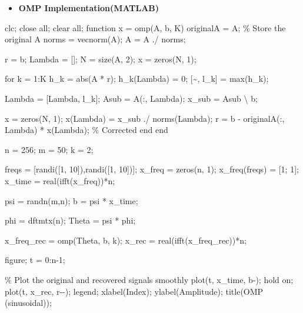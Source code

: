 \documentclass[
  letterpaper,
  DIV=11,
  numbers=noendperiod]{scrartcl}
\newenvironment{Shaded}{\begin{snugshade}}{\end{snugshade}}
\newcommand{\NormalTok}[1]{\textcolor[rgb]{0.97,0.97,0.95}{#1}}
\providecommand{\tightlist}{%
  \setlength{\itemsep}{0pt}\setlength{\parskip}{0pt}}
\begin{document}
\begin{itemize}
\tightlist
\item
  \textbf{OMP Implementation(MATLAB)}
\end{itemize}

\begin{Shaded}
\begin{Highlighting}[]
\NormalTok{clc; close all; clear all;}
\NormalTok{function x = omp(A, b, K)}
\NormalTok{    originalA = A;               \% Store the original A}
\NormalTok{    norms = vecnorm(A);}
\NormalTok{    A = A ./ norms;}

\NormalTok{    r = b;}
\NormalTok{    Lambda = [];}
\NormalTok{    N = size(A, 2);}
\NormalTok{    x = zeros(N, 1);}

\NormalTok{    for k = 1:K}
\NormalTok{        h\_k = abs(A\textquotesingle{} * r);}
\NormalTok{        h\_k(Lambda) = 0;}
\NormalTok{        [\textasciitilde{}, l\_k] = max(h\_k);}

\NormalTok{        Lambda = [Lambda, l\_k];}
\NormalTok{        Asub = A(:, Lambda);}
\NormalTok{        x\_sub = Asub \textbackslash{} b;}

\NormalTok{        x = zeros(N, 1);}
\NormalTok{        x(Lambda) = x\_sub ./ norms(Lambda)\textquotesingle{};}
\NormalTok{        r = b {-} originalA(:, Lambda) * x(Lambda);   \% Corrected}
\NormalTok{    end}
\NormalTok{end}

\NormalTok{n = 256;     }
\NormalTok{m = 50;      }
\NormalTok{k = 2;        }

\NormalTok{freqs = [randi([1, 10]),randi([1, 10])];              }
\NormalTok{x\_freq = zeros(n, 1);              }
\NormalTok{x\_freq(freqs) = [1; 1];            }
\NormalTok{x\_time = real(ifft(x\_freq))*n;       }

\NormalTok{psi = randn(m,n);                  }
\NormalTok{b = psi * x\_time;                     }

\NormalTok{phi = dftmtx(n);}
\NormalTok{Theta = psi * phi\textquotesingle{};                    }

\NormalTok{x\_freq\_rec = omp(Theta, b, k);      }
\NormalTok{x\_rec = real(ifft(x\_freq\_rec))*n;    }

\NormalTok{figure;}
\NormalTok{t = 0:n{-}1;}

\NormalTok{\% Plot the original and recovered signals smoothly}
\NormalTok{plot(t, x\_time, \textquotesingle{}b{-}\textquotesingle{}); hold on;}
\NormalTok{plot(t, x\_rec, \textquotesingle{}r{-}{-}\textquotesingle{});}
\NormalTok{legend;}
\NormalTok{xlabel(\textquotesingle{}Index\textquotesingle{});}
\NormalTok{ylabel(\textquotesingle{}Amplitude\textquotesingle{});}
\NormalTok{title(\textquotesingle{}OMP (sinusoidal)\textquotesingle{});}
\end{Highlighting}
\end{Shaded}
\end{document}
